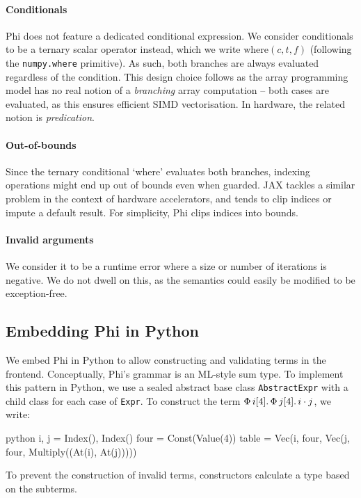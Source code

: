 \paragraph{Conditionals} Phi does not feature a dedicated conditional expression. We consider conditionals to be a ternary scalar operator instead, which we write $\mathrm{where}(c, t, f)$ (following the \texttt{numpy.where} primitive). As such, both branches are always evaluated regardless of the condition. This design choice follows as the array programming model has no real notion of a \textit{branching} array computation -- both cases are evaluated, as this ensures efficient SIMD vectorisation. In hardware, the related notion is \textit{predication}.

\paragraph{Out-of-bounds} Since the ternary conditional `where' evaluates both branches, indexing operations might end up out of bounds even when guarded. 
JAX tackles a similar problem in the context of hardware accelerators, 
and tends to clip indices or impute a default result. 
For simplicity, Phi clips indices into bounds.

\paragraph{Invalid arguments} We consider it to be a runtime error where a size or number of iterations is negative. We do not dwell on this, as the semantics could easily be modified to be exception-free.

\subsection{Embedding Phi in Python}
\label{embedding-phi}

We embed Phi in Python to allow constructing and validating terms in the frontend. Conceptually, Phi's grammar is an ML-style sum type. To implement this pattern in Python, we use a sealed abstract base class \texttt{AbstractExpr} with a child class for each case of \texttt{Expr}. To construct the term $\Phi\, {i}[{4}] \ldotp {\Phi\, {j}[{4}] \ldotp {i \cdot j}}$, we write:
\begin{center}
\begin{cminted}{python}
i, j = Index(), Index()
four = Const(Value(4))
table = Vec(i, four, Vec(j, four, Multiply((At(i), At(j)))))
\end{cminted}
\end{center}
To prevent the construction of invalid terms, constructors calculate a type based on the subterms. 


